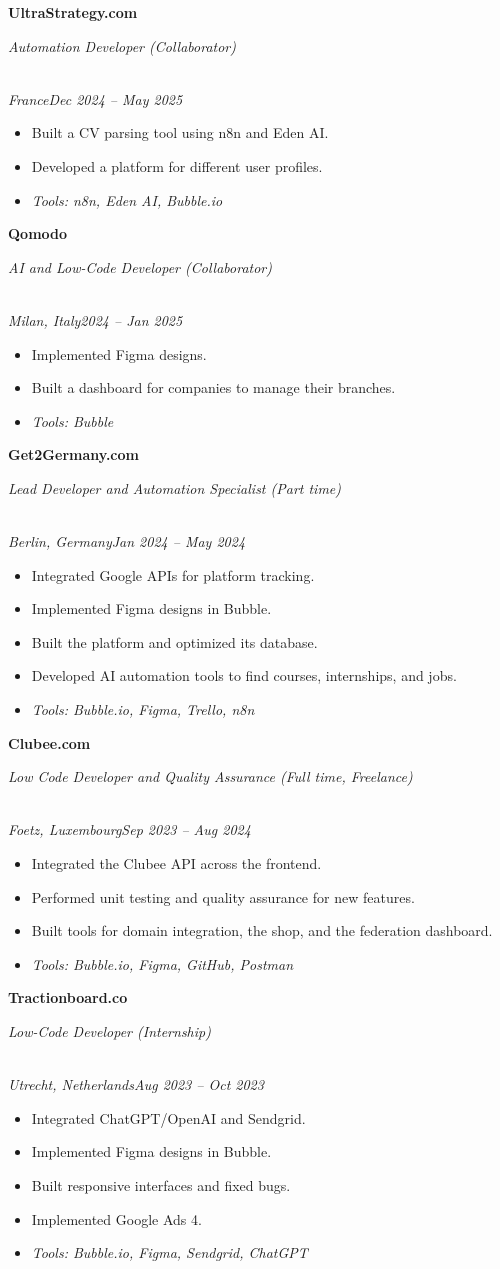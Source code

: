 \documentclass[a4paper,10pt]{article}
\newcommand{\role}[4]{\vspace{3pt}\noindent\hspace{0.6em}\parbox[t]{0.38\textwidth}{\raggedright\textbf{#1}}\hfill\parbox[t]{0.58\textwidth}{\raggedleft\textit{#2}}\\{\textit{#3}\hfill\textit{#4}}\vspace{1pt}}
\begin{document}
\newpage
\role{UltraStrategy.com}{Automation Developer (Collaborator)}{France}{Dec 2024 -- May 2025}
\begin{itemize}
\item Built a CV parsing tool using n8n and Eden AI.
\item Developed a platform for different user profiles.
\item \textit{Tools: n8n, Eden AI, Bubble.io}
\end{itemize}

\role{Qomodo}{AI and Low-Code Developer (Collaborator)}{Milan, Italy}{2024 -- Jan 2025}
\begin{itemize}
\item Implemented Figma designs.
\item Built a dashboard for companies to manage their branches.
\item \textit{Tools: Bubble}
\end{itemize}

\role{Get2Germany.com}{Lead Developer and Automation Specialist (Part time)}{Berlin, Germany}{Jan 2024 -- May 2024}
\begin{itemize}
\item Integrated Google APIs for platform tracking.
\item Implemented Figma designs in Bubble.
\item Built the platform and optimized its database.
\item Developed AI automation tools to find courses, internships, and jobs.
\item \textit{Tools: Bubble.io, Figma, Trello, n8n}
\end{itemize}

\role{Clubee.com}{Low Code Developer and Quality Assurance (Full time, Freelance)}{Foetz, Luxembourg}{Sep 2023 -- Aug 2024}
\begin{itemize}
\item Integrated the Clubee API across the frontend.
\item Performed unit testing and quality assurance for new features.
\item Built tools for domain integration, the shop, and the federation dashboard.
\item \textit{Tools: Bubble.io, Figma, GitHub, Postman}
\end{itemize}

\role{Tractionboard.co}{Low-Code Developer (Internship)}{Utrecht, Netherlands}{Aug 2023 -- Oct 2023}
\begin{itemize}
\item Integrated ChatGPT/OpenAI and Sendgrid.
\item Implemented Figma designs in Bubble.
\item Built responsive interfaces and fixed bugs.
\item Implemented Google Ads 4.
\item \textit{Tools: Bubble.io, Figma, Sendgrid, ChatGPT}
\end{itemize}
\end{document}

